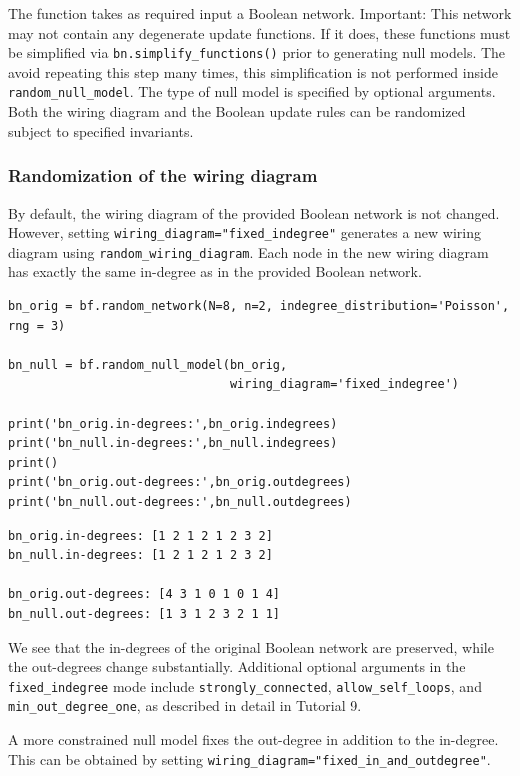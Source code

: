 \documentclass[
]{article}
\begin{document}
The function takes as required input a Boolean network. Important: This
network may not contain any degenerate update functions. If it does,
these functions must be simplified via \texttt{bn.simplify\_functions()}
prior to generating null models. The avoid repeating this step many
times, this simplification is not performed inside
\texttt{random\_null\_model}. The type of null model is specified by
optional arguments. Both the wiring diagram and the Boolean update rules
can be randomized subject to specified invariants.

\subsubsection{Randomization of the wiring
diagram}\label{randomization-of-the-wiring-diagram}

By default, the wiring diagram of the provided Boolean network is not
changed. However, setting \texttt{wiring\_diagram="fixed\_indegree"}
generates a new wiring diagram using \texttt{random\_wiring\_diagram}.
Each node in the new wiring diagram has exactly the same in-degree as in
the provided Boolean network.

\begin{lstlisting}
bn_orig = bf.random_network(N=8, n=2, indegree_distribution='Poisson', rng = 3)

bn_null = bf.random_null_model(bn_orig, 
                               wiring_diagram='fixed_indegree')

print('bn_orig.in-degrees:',bn_orig.indegrees)
print('bn_null.in-degrees:',bn_null.indegrees)
print()
print('bn_orig.out-degrees:',bn_orig.outdegrees)
print('bn_null.out-degrees:',bn_null.outdegrees)
\end{lstlisting}

\begin{lstlisting}
bn_orig.in-degrees: [1 2 1 2 1 2 3 2]
bn_null.in-degrees: [1 2 1 2 1 2 3 2]

bn_orig.out-degrees: [4 3 1 0 1 0 1 4]
bn_null.out-degrees: [1 3 1 2 3 2 1 1]
\end{lstlisting}

We see that the in-degrees of the original Boolean network are
preserved, while the out-degrees change substantially. Additional
optional arguments in the \texttt{fixed\_indegree} mode include
\texttt{strongly\_connected}, \texttt{allow\_self\_loops}, and
\texttt{min\_out\_degree\_one}, as described in detail in Tutorial 9.

A more constrained null model fixes the out-degree in addition to the
in-degree. This can be obtained by setting
\texttt{wiring\_diagram="fixed\_in\_and\_outdegree"}.
\end{document}
